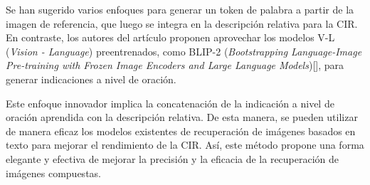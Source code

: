 Se han sugerido varios enfoques para generar un token de palabra a partir de la imagen de referencia, que luego se integra en la descripción relativa para la CIR. En contraste, los autores del artículo proponen aprovechar los modelos V-L (\textit{Vision - Language}) preentrenados, como BLIP-2 (\textit{Bootstrapping Language-Image Pre-training with Frozen Image Encoders and Large Language Models})[\cite{blip-2}], para generar indicaciones a nivel de oración.

Este enfoque innovador implica la concatenación de la indicación a nivel de oración aprendida con la descripción relativa. De esta manera, se pueden utilizar de manera eficaz los modelos existentes de recuperación de imágenes basados en texto para mejorar el rendimiento de la CIR. Así, este método propone una forma elegante y efectiva de mejorar la precisión y la eficacia de la recuperación de imágenes compuestas.